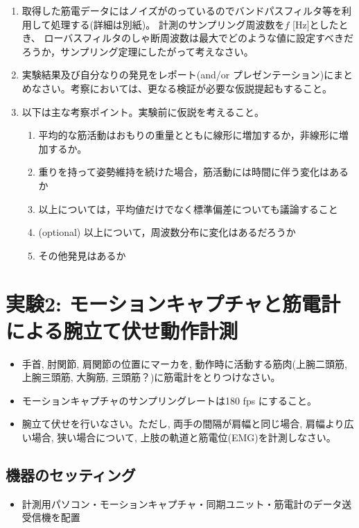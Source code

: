 \documentclass{jsarticle}
\begin{document}
\begin{enumerate}
  \item 取得した筋電データにはノイズがのっているのでバンドパスフィルタ等を利用して処理する(詳細は別紙)。
  計測のサンプリング周波数を$f$ [Hz]としたとき、
  ローバスフィルタのしゃ断周波数は最大でどのような値に設定すべきだろうか，サンプリング定理にしたがって考えなさい。
  \item 実験結果及び自分なりの発見をレポート(and/or プレゼンテーション)にまとめなさい。考察においては、更なる検証が必要な仮説提起もすること。
  \item 以下は主な考察ポイント。実験前に仮説を考えること。
  \begin{enumerate}
    \item 平均的な筋活動はおもりの重量とともに線形に増加するか，非線形に増加するか。
    \item 重りを持って姿勢維持を続けた場合，筋活動には時間に伴う変化はあるか
    \item 以上については，平均値だけでなく標準偏差についても議論すること
    \item (optional) 以上について，周波数分布に変化はあるだろうか
    \item その他発見はあるか
  \end{enumerate}
  
\end{enumerate}


\section{実験2: モーションキャプチャと筋電計による腕立て伏せ動作計測}


\begin{itemize}
\item 手首, 肘関節, 肩関節の位置にマーカを, 動作時に活動する筋肉(上腕二頭筋, 上腕三頭筋, 大胸筋, 三頭筋？)に筋電計をとりつけなさい。
\item モーションキャプチャのサンプリングレートは180 fps にすること。
\item 腕立て伏せを行いなさい。ただし, 両手の間隔が肩幅と同じ場合, 肩幅より広い場合, 狭い場合について, 上肢の軌道と筋電位(EMG)を計測しなさい。
\end{itemize}


\subsection{機器のセッティング}
\begin{itemize}
\item 計測用パソコン・モーションキャプチャ・同期ユニット・筋電計のデータ送受信機を配置
\end{itemize}
\end{document}
